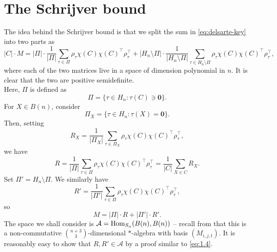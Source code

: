 \clearpage
\section{The Schrijver bound}
\label{subsec:schrijver}

	The idea behind the Schrijver bound is that we split the sum in \cref{eq:delsarte-key} into two parts as 
	\[ |C| \cdot M = |\Pi| \cdot \frac{1}{|\Pi|} \sum_{\tau \in \Pi} \rho_\tau \chi(C) \chi(C)^\top \rho_\tau^\top + |H_n \setminus \Pi| \cdot \frac{1}{|H_n \setminus \Pi|} \sum_{\tau \in H_n \setminus \Pi} \rho_\tau \chi(C) \chi(C)^\top \rho_\tau^\top, \]
	where each of the two matrices live in a space of dimension polynomial in $n$. It is clear that the two are positive semidefinite.\\
	Here, $\Pi$ is defined as
	\[ \Pi = \{ \tau \in H_n : \tau(C) \ni \mathbf{0} \}. \]
	For $X \in B(n)$, consider
	\[ \Pi_X = \{ \tau \in H_n : \tau(X) = \mathbf{0} \}. \]
	Then, setting 
	\[ R_X = \frac{1}{|\Pi_X|} \sum_{\tau \in \Pi_X} \rho_{\tau} \chi(C) \chi(C)^\top \rho_\tau^\top, \]
	we have
	\[ R = \frac{1}{|\Pi|} \sum_{\tau \in \Pi} \rho_{\tau} \chi(C) \chi(C)^\top \rho_\tau^\top = \frac{1}{|C|} \sum_{X \in C} R_X. \]
	Set $\Pi' = H_n \setminus \Pi$. We similarly have
	\[ R' = \frac{1}{|\Pi'|} \sum_{\tau \in \Pi} \rho_{\tau} \chi(C) \chi(C)^\top \rho_\tau^\top, \]
	so
	\[ M = |\Pi| \cdot R + |\Pi'| \cdot R'. \]
	The space we shall consider is $\mathcal{A} = \operatorname{Hom}_{S_n}(B(n),B(n))$ -- recall from  that this is a non-commutative $\binom{n+3}{3}$-dimensional $*$-algebra with basis $(M_{i,j,t})$. It is reasonably easy to show that $R,R' \in \mathcal{A}$ by a proof similar to \cref{eq:1.4}.

